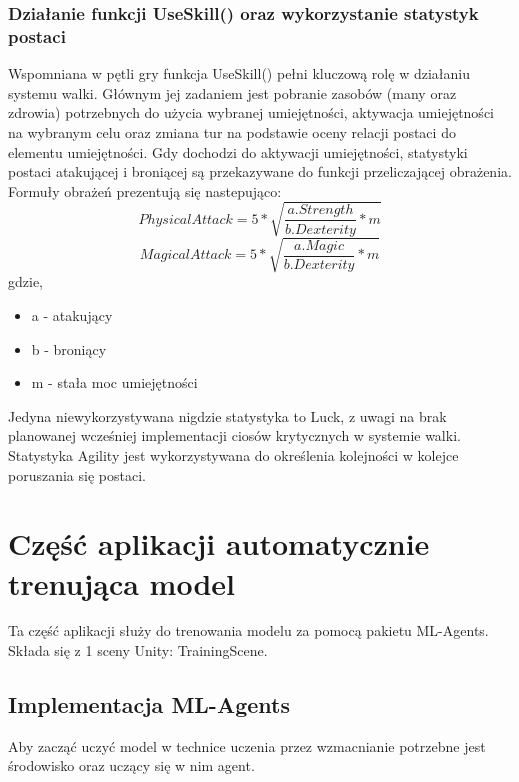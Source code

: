 \documentclass{SGGW-thesis}
\begin{document}
\subsubsection{Działanie funkcji UseSkill() oraz wykorzystanie statystyk postaci}
Wspomniana w pętli gry funkcja UseSkill() pełni kluczową rolę w działaniu systemu walki. Głównym jej zadaniem jest pobranie zasobów (many oraz zdrowia) potrzebnych do użycia wybranej umiejętności, 
aktywacja umiejętności na wybranym celu oraz zmiana tur na podstawie oceny relacji postaci do elementu umiejętności. Gdy dochodzi do aktywacji umiejętności, statystyki postaci atakującej i broniącej są przekazywane do funkcji przeliczającej obrażenia. 
Formuły obrażeń prezentują się nastepująco:
\[PhysicalAttack = 5*\sqrt{\frac{a.Strength}{b.Dexterity}*m}\]\[MagicalAttack = 5*\sqrt{\frac{a.Magic}{b.Dexterity}*m}\]
gdzie,
\begin{itemize}
  \item{a - atakujący}
  \item{b - broniący}
  \item{m - stała moc umiejętności}
\end{itemize}
Jedyna niewykorzystywana nigdzie statystyka to Luck, z uwagi na brak planowanej wcześniej implementacji ciosów krytycznych w systemie walki.
Statystyka Agility jest wykorzystywana do określenia kolejności w kolejce poruszania się postaci.


\section{Część aplikacji automatycznie trenująca model}
Ta część aplikacji służy do trenowania modelu za pomocą pakietu ML-Agents. Składa się z 1 sceny Unity: TrainingScene.

\subsection{Implementacja ML-Agents}
Aby zacząć uczyć model w technice uczenia przez wzmacnianie potrzebne jest środowisko oraz uczący się w nim agent.
\end{document}
